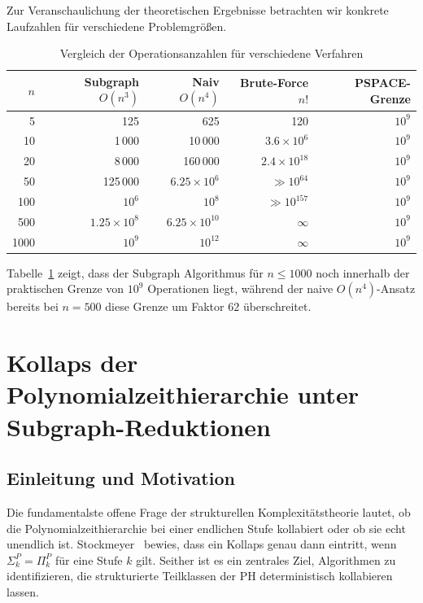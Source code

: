 ﻿\documentclass[a4paper,12pt]{article}
\theoremstyle{definition}
\begin{document}
Zur Veranschaulichung der theoretischen Ergebnisse betrachten wir
konkrete Laufzahlen für verschiedene Problemgrößen.

\begin{table}[htbp]
  \centering
  \caption{Vergleich der Operationsanzahlen für verschiedene Verfahren}
  \label{tab:ops}
  \begin{tabular}{r r r r r}
    \toprule
    $n$ & Subgraph $O(n^3)$ & Naiv $O(n^4)$ & Brute-Force $n!$ & PSPACE-Grenze \\
    \midrule
    5   & 125       & 625         & 120         & $10^9$ \\
    10  & 1\,000    & 10\,000     & $3.6 \times 10^6$  & $10^9$ \\
    20  & 8\,000    & 160\,000    & $2.4 \times 10^{18}$ & $10^9$ \\
    50  & 125\,000  & $6.25 \times 10^6$ & $\gg 10^{64}$ & $10^9$ \\
    100 & $10^6$    & $10^8$      & $\gg 10^{157}$ & $10^9$ \\
    500 & $1.25 \times 10^8$ & $6.25 \times 10^{10}$ & $\infty$ & $10^9$ \\
    1000& $10^9$    & $10^{12}$   & $\infty$    & $10^9$ \\
    \bottomrule
  \end{tabular}
\end{table}

Tabelle~\ref{tab:ops} zeigt, dass der Subgraph Algorithmus für
$n \leq 1000$ noch innerhalb der praktischen Grenze von $10^9$ Operationen liegt,
während der naive $O(n^4)$-Ansatz bereits bei $n = 500$ diese Grenze um
Faktor $62$ überschreitet.

\section{Kollaps der Polynomialzeithierarchie unter Subgraph-Reduktionen}
\label{sec:kollaps}

\subsection{Einleitung und Motivation}

Die fundamentalste offene Frage der strukturellen Komplexitätstheorie lautet,
ob die Polynomialzeithierarchie bei einer endlichen Stufe kollabiert oder ob sie
echt unendlich ist. Stockmeyer~\cite{stockmeyer1976poly} bewies, dass ein Kollaps
genau dann eintritt, wenn $\Sigma_k^P = \Pi_k^P$ für eine Stufe $k$ gilt.
Seither ist es ein zentrales Ziel, Algorithmen zu identifizieren, die
strukturierte Teilklassen der PH deterministisch kollabieren lassen.
\end{document}
